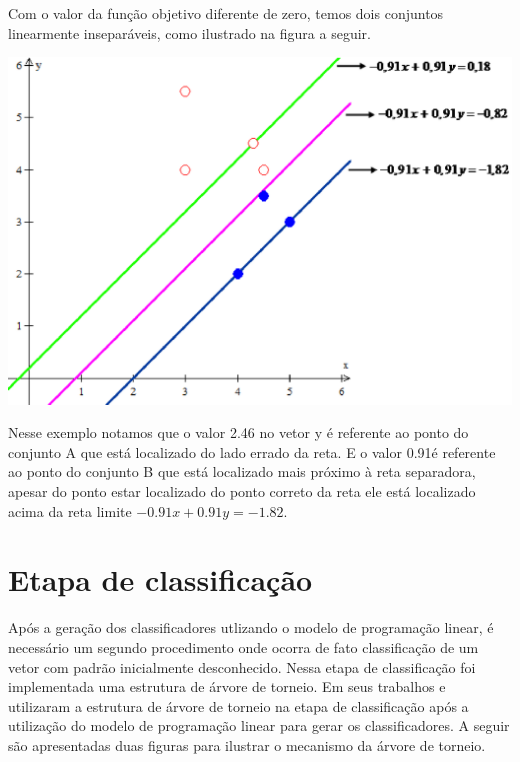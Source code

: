 \begin{itemize}
Com o valor da função objetivo diferente de zero, temos dois conjuntos linearmente inseparáveis, como ilustrado na figura a seguir.

\begin{center}
	\includegraphics[scale=0.5]{graficos/exemplo1}
	\label{img:ex2}
\end{center}

Nesse exemplo notamos que o valor 2.46 no vetor y é referente ao ponto do conjunto A que está localizado do lado errado da reta. E o valor 0.91é referente ao ponto do conjunto B que está localizado mais próximo à reta separadora, apesar do ponto estar localizado do ponto correto da reta ele está localizado acima da reta limite $-0.91x + 0.91y = -1.82$.
\end{itemize}

\section{Etapa de classificação}
Após a geração dos classificadores utlizando o modelo de programação linear, é necessário um segundo procedimento onde ocorra de fato classificação de um vetor com padrão inicialmente desconhecido. Nessa etapa de classificação foi implementada uma estrutura de árvore de torneio.
Em seus trabalhos  e  utilizaram a estrutura de árvore de torneio na etapa de classificação após a utilização do modelo de programação linear para gerar os classificadores.
A seguir são apresentadas duas figuras para ilustrar o mecanismo da árvore de torneio.

